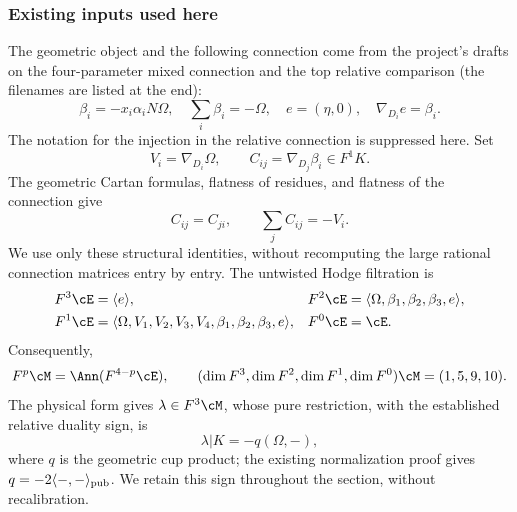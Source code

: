 \documentclass[11pt,a4paper,oneside]{article}
\theoremstyle{plain}
\theoremstyle{definition}
\theoremstyle{remark}
\numberwithin{equation}{section}
\begin{document}
\subsubsection{Existing inputs used here}
The geometric object and the following connection come from the project's drafts on the four-parameter mixed connection and the top relative comparison
(the filenames are listed at the end):
\begin{equation}\label{deriv:eq:beta}
 \beta_i=-x_i\alpha_iN\Omega,\quad
 \sum_i\beta_i=-\Omega,\quad e=(\eta,0),\quad
 \nabla_{D_i}e=\beta_i.
\end{equation}
The notation for the injection in the relative connection is suppressed here. Set
\begin{equation}\label{deriv:eq:C}
 V_i=\nabla_{D_i}\Omega,\qquad
 C_{ij}=\nabla_{D_j}\beta_i\in F^1K.
\end{equation}
The geometric Cartan formulas, flatness of residues, and flatness of the connection give
\begin{equation}\label{deriv:eq:sum}
 C_{ij}=C_{ji},\qquad \sum_j C_{ij}=-V_i.
\end{equation}
We use only these structural identities, without recomputing the large rational connection matrices entry by entry.
The untwisted Hodge filtration is
\begin{align}\label{deriv:eq:filterE}
 F^3\cE&=\langle e\rangle,&
 F^2\cE&=\langle\Omega,\beta_1,\beta_2,\beta_3,e\rangle,\nonumber\\
 F^1\cE&=\langle\Omega,V_1,V_2,V_3,V_4,\beta_1,\beta_2,\beta_3,e\rangle,&
 F^0\cE&=\cE.
\end{align}
Consequently,
\begin{equation}\label{deriv:eq:dualHodge}
 F^p\cM=\Ann(F^{4-p}\cE),\qquad
 (\dim F^3,\dim F^2,\dim F^1,\dim F^0)\cM=(1,5,9,10).
\end{equation}
The physical form gives $\lambda\in F^3\cM$, whose pure restriction, with the established relative duality sign, is
\begin{equation}\label{deriv:eq:lambda}
 \lambda|K=-q(\Omega,-),
\end{equation}
where $q$ is the geometric cup product; the existing normalization proof gives $q=-2\langle-,-\rangle_{\rm pub}$.
We retain this sign throughout the section, without recalibration.
\end{document}
